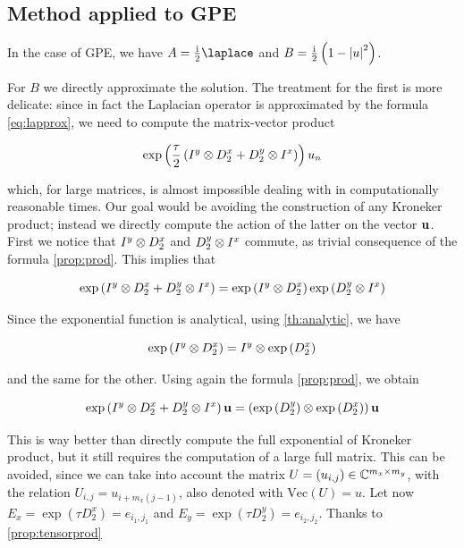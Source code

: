 \subsection{Method applied to GPE}

In the case of GPE, we have $A = \frac\ii2 \lap$ and $B = \frac{\mathrm{i}}2 \left(1 - \left| u \right|^2\right)$. 

For $B$ we directly approximate the solution. The treatment for the first is more delicate: since in fact the Laplacian operator is approximated by the formula \ref{eq:lapprox}, we need to compute the matrix-vector product 

\[
    \exp\left(\frac\tau2 \left(I^y \otimes D_2^x + D_2^y \otimes I^x\right)\right)u_n
\]

which, for large matrices, is almost impossible dealing with in computationally reasonable times. Our goal would be avoiding the construction of any Kroneker product; instead we directly compute the action of the latter on the vector $\mathbf{u}$. First we notice that $I^y \otimes D_2^x$ and $D_2^y \otimes I^x$ commute, as trivial consequence of the formula \ref{prop:prod}. This implies that 

\[ \exp\left(I^y \otimes D_2^x + D_2^y \otimes I^x\right) = \exp\left(I^y \otimes D_2^x\right)\exp\left(D_2^y \otimes I^x\right) \]

Since the exponential function is analytical, using \ref{th:analytic}, we have

\[ \exp\left(I^y \otimes D_2^x\right) = I^y \otimes \exp\left(D_2^x\right) \]

and the same for the other. Using again the formula \ref{prop:prod}, we obtain 

\[ \exp\left(I^y \otimes D_2^x + D_2^y \otimes I^x\right)\mathbf{u} = \left(\exp\left(D_2^y\right) \otimes \exp\left(D_2^x\right)\right)\mathbf{u} \]

This is way better than directly compute the full exponential of Kroneker product, but it still requires the computation of a large full matrix. This can be avoided, since we can take into account the matrix $U = (u_{i,j}) \in \mathbb{C}^{m_x \times m_y}$, with the relation $U_{i,j} = u_{i + m_x(j - 1)}$, also denoted with $\mbox{Vec}(U) = u$. Let now $E_x = \exp\left(\tau D_2^x\right) = e_{i_1, j_1}$ and $E_y = \exp\left(\tau D_2^y\right) = e_{i_2, j_2}$. Thanks to \ref{prop:tensorprod}

